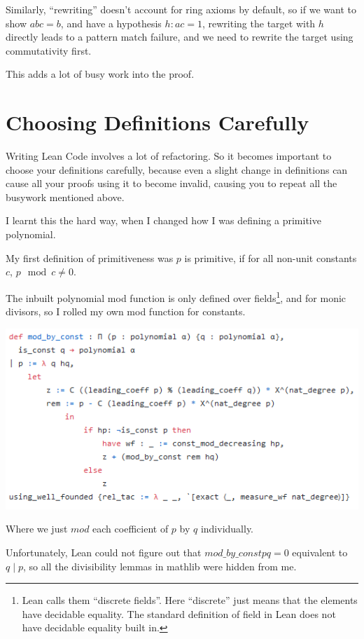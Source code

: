 \documentclass[pagesize=a4]{scrreprt}
\begin{document}
Similarly, ``rewriting'' doesn't account for ring axioms by default, so if we want to show $a b c = b$, and have a hypothesis $h : a c = 1$, rewriting the target with $h$ directly leads to a pattern match failure, and we need to rewrite the target using commutativity first.

This adds a lot of busy work into the proof. 

\section{Choosing Definitions Carefully}

Writing Lean Code involves a lot of refactoring. So it becomes important to choose your definitions carefully, because even a slight change in definitions can cause all your proofs using it to become invalid, causing you to repeat all the busywork mentioned above. 

I learnt this the hard way, when I changed how I was defining a primitive polynomial. 

My first definition of primitiveness was $p$ is primitive, if for all non-unit constants $c$, $p \mod c \neq 0$. 

The inbuilt polynomial mod function is only defined over fields\footnote{Lean calls them ``discrete fields''. Here ``discrete'' just means that the elements have decidable equality. The standard definition of field in Lean does not have decidable equality built in.}, and for monic divisors, so I rolled my own mod function for constants. 

\includegraphics{const_mod.png}

Where we just $mod$ each coefficient of $p$ by $q$ individually. 

Unfortunately, Lean could not figure out that $mod\_by\_const p q = 0$ equivalent to $q \mid p$, so all the divisibility lemmas in mathlib were hidden from me.
\end{document}
